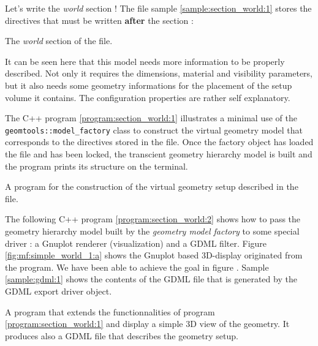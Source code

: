 \pn  Let's   write  the  \emph{world}   section  !  The   file  sample
\ref{sample:section_world:1}  stores  the   directives  that  must  be
written \textbf{after} the  section :
\begin{sample}
\caption{The \emph{world}
  section of the   file.}
\label{sample:section_world:1}
\end{sample}

\pn It can  be seen here that this model needs  more information to be
properly described.  Not only it requires the dimensions, material and
visibility parameters,  but it  also needs some  geometry informations
for the placement  of the setup volume it  contains. The configuration
properties are rather self explanatory.

\pn  The  C++   program  \ref{program:section_world:1}  illustrates  a
minimal  use   of  the  \texttt{geomtools::model\_factory}   class  to
construct  the   virtual  geometry  model  that   corresponds  to  the
directives  stored in the   file.   Once the
factory object has loaded the file and has been locked, the transcient
geometry hierarchy model is built and the program prints its structure
on the terminal.


\begin{program}[h]
\caption{A program for the  construction of the virtual geometry setup
  described in the  file.}
\label{program:section_world:1}
\end{program}


\pn The following  C++ program \ref{program:section_world:2} shows how
to pass the geometry hierarchy model built by the \emph{geometry model
  factory} to some special driver : a Gnuplot renderer (visualization)
and  a GDML  filter.  Figure  \ref{fig:mf:simple_world_1:a}  shows the
Gnuplot  based 3D-display originated  from the  program. We  have been
able  to   achieve  the   goal  in  figure   \label{fig:mf:0}.  Sample
\ref{sample:gdml:1}  shows  the contents  of  the  GDML  file that  is
generated by the GDML export driver object.


\begin{program}[hp]
\caption{A  program  that  extends  the  functionnalities  of  program
  \ref{program:section_world:1} and  display a  simple 3D view  of the
  geometry. It produces  also a GDML file that  describes the geometry
  setup.}
\label{program:section_world:2}
\end{program}

